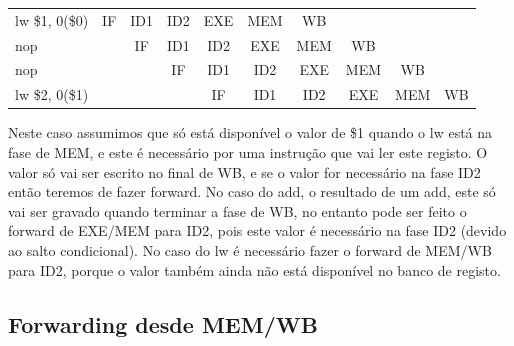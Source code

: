 \documentclass[pdftex,12pt,a4paper]{report}
\begin{document}
\begin{table}[!htb]
\centering
\label{my-label}
\begin{tabular}{lccc|c|c|c|ccc}
\cline{2-7}
\multicolumn{1}{l|}{lw \$1, 0(\$0)} & \multicolumn{1}{c|}{IF} & \multicolumn{1}{c|}{ID1} & ID2 & EXE & \cellcolor[HTML]{F8A102}MEM & \cellcolor[HTML]{FFCC67}WB  &                          &                          &                         \\ \cline{2-8}
nop                               & \multicolumn{1}{c|}{}   & \multicolumn{1}{c|}{IF}  & ID1 & ID2 & EXE                         & MEM                         & \multicolumn{1}{c|}{WB}  &                          &                         \\ \cline{3-9}
nop                               &                         & \multicolumn{1}{c|}{}    & IF  & ID1 & ID2                         & EXE                         & \multicolumn{1}{c|}{MEM} & \multicolumn{1}{c|}{WB}  &                         \\ \cline{4-10} 
lw \$2, 0(\$1)                      &                         &                          &     & IF  & ID1                         & \cellcolor[HTML]{F8A102}ID2 & \multicolumn{1}{c|}{EXE} & \multicolumn{1}{c|}{MEM} & \multicolumn{1}{c|}{WB} \\ \cline{5-10} 
\end{tabular}
\end{table}

Neste caso assumimos que só está disponível o valor de \$1 quando o lw está na fase de MEM, e este é necessário por uma instrução que vai ler este registo. O valor só vai ser escrito no final de WB, e se o valor for necessário na fase ID2 então teremos de fazer forward. No caso do add, o resultado de um add, este só vai ser gravado quando terminar a fase de WB, no entanto pode ser feito o forward de EXE/MEM para ID2, pois este valor é necessário na fase ID2 (devido ao salto condicional). No caso do lw é necessário fazer o forward de MEM/WB para ID2, porque o valor também ainda não está disponível no banco de registo.

\subsection{Forwarding desde MEM/WB}
\end{document}
